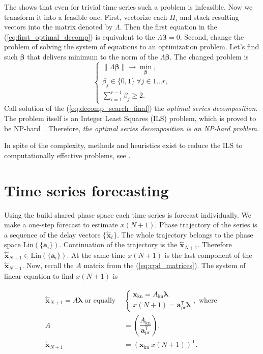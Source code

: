 \documentclass[referee, pdflatex, sn-mathphys-num]{sn-jnl}
\theoremstyle{definition}
\theoremstyle{plain}
\newcommand{\delayV}[1]{\overset{\leftarrow}{\mathbf{x}}_{#1}}
\begin{document}
	The \cite{ecfb9dc578be43ae9ee8fc88b8ff9151} shows that even for trivial time series such a problem is infeasible. Now we transform it into a feasible one. First, vectorize each $ H_i $ and stack resulting vectors into the matrix denoted by $ \Lambda $. Then the first equation in the (\ref{eq:first_optimal_decomp}) is equivalent to the $ \Lambda \boldsymbol{\beta} = 0 $. Second, change the problem of solving the system of equations to an optimization problem. Let's find such $ \boldsymbol{\beta} $ that delivers minimum to the norm of the $ \Lambda \boldsymbol{\beta} $. The changed problem is
	\begin{equation}\label{eq:decomp_search_final}
		\begin{cases*}
			\lVert \Lambda \boldsymbol{\beta} \rVert \to \underset{\boldsymbol{\beta}}{\min}, \\
			\beta_j \in \{0, 1\} \ \forall j \in 1 \ldots r, \\
			\sum\limits_{i = 1}^{r - 1} \beta_j \ge 2.
		\end{cases*}
	\end{equation}
	Call solution of the (\ref{eq:decomp_search_final}) the \emph{optimal series decomposition}. The problem itself is an Integer Least Squares (ILS) problem, which is proved to be NP-hard~\cite{van1981another}. Therefore, \emph{the optimal series decomposition is an NP-hard problem}.
	
	In spite of the complexity, methods and heuristics exist to reduce the ILS to computationally effective problems, see \cite{Grafarend2022}.
	
	\section{Time series forecasting}\label{sec:tssa_forecast}
	
	Using the build shared phase space each time series is forecast individually. We make a one-step forecast to estimate $ x(N + 1) $. Phase trajectory of the series is a sequence of the delay vectors $ \{ \delayV{t} \} $. The whole trajectory belongs to the phase space $ \text{Lin}(\{\mathbf{a}_i\}) $. Continuation of the trajectory is the $ \delayV{N + 1} $. Therefore $ \delayV{N + 1} \in \text{Lin}(\{\mathbf{a}_i\}) $. At the same time $ x(N + 1) $ is the last component of the $ \delayV{N + 1} $. Now, recall the $ A $ matrix from the (\ref{eq:cpd_matrices}). The system of linear equation to find $ x(N + 1) $ is
	
	\begin{align}\label{eq:main_pred_for_A}
		\delayV{N + 1} = A \boldsymbol{\lambda} \text{ or equally } &\begin{cases}
			\mathbf{x}_{\text{kn}} = A_{\text{kn}} \boldsymbol{\lambda}  \\
			x(N + 1) = \mathbf{a}_{\text{pr}}^{\mathsf{T}} \boldsymbol{\lambda}
		\end{cases}, \text{ where } \\
		A &= \left( \dfrac{A_{\text{kn}}}{\mathbf{a}_{\text{pr}}^{\mathsf{T}}} \right), \label{eq:A_split} \\
		\delayV{N + 1} &= (\mathbf{x}_{\text{kn}} \  x(N + 1))^{\mathsf{T}}. \label{eq:del_vec_split}
	\end{align}
	
\end{document}
